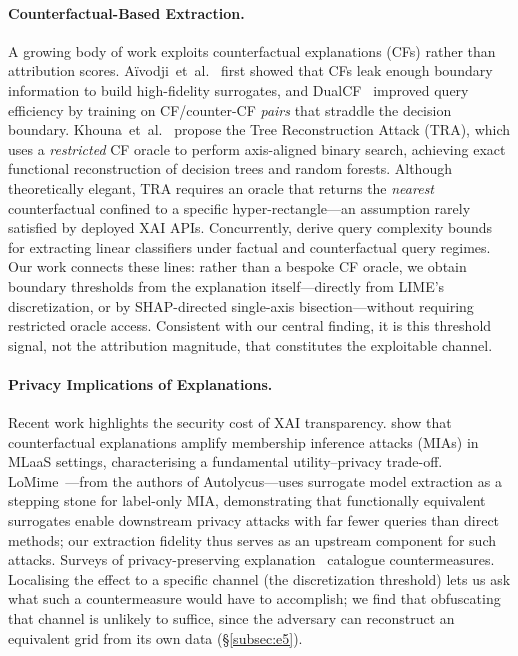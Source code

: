 \documentclass[sigconf,anonymous,review]{acmart}
\begin{document}
\paragraph{Counterfactual-Based Extraction.}
A growing body of work exploits counterfactual explanations (CFs) rather than
attribution scores.
A\"ivodji~et~al.~\cite{aivodji2020model} first showed that CFs leak enough
boundary information to build high-fidelity surrogates, and DualCF~\cite{wang2022dualcf}
improved query efficiency by training on CF/counter-CF \emph{pairs} that
straddle the decision boundary.
Khouna~et~al.~\cite{khouna2025tra} propose the Tree Reconstruction Attack (TRA),
which uses a \emph{restricted} CF oracle to perform axis-aligned binary search,
achieving exact functional reconstruction of decision trees and random forests.
Although theoretically elegant, TRA requires an oracle that returns the
\emph{nearest} counterfactual confined to a specific hyper-rectangle---an assumption
rarely satisfied by deployed XAI APIs.
Concurrently, \citet{otto2026linear} derive query complexity bounds for extracting
linear classifiers under factual and counterfactual query regimes.
Our work connects these lines: rather than a bespoke CF oracle, we obtain boundary
thresholds from the explanation itself---directly from LIME's discretization, or by
SHAP-directed single-axis bisection---without requiring restricted oracle access.
Consistent with our central finding, it is this threshold signal, not the attribution
magnitude, that constitutes the exploitable channel.

\paragraph{Privacy Implications of Explanations.}
Recent work highlights the security cost of XAI transparency.
\citet{ezzeddine2026membership} show that counterfactual explanations amplify
membership inference attacks (MIAs) in MLaaS settings, characterising a
fundamental utility--privacy trade-off.
LoMime~\cite{oksuz2026lomime}---from the authors of Autolycus---uses surrogate model
extraction as a stepping stone for label-only MIA, demonstrating that functionally
equivalent surrogates enable downstream privacy attacks with far fewer queries than
direct methods; our extraction fidelity thus serves as an upstream component for such
attacks.
Surveys of privacy-preserving explanation~\cite{nguyen2024survey} catalogue
countermeasures. Localising the effect to a specific channel (the discretization
threshold) lets us ask what such a countermeasure would have to accomplish; we find
that obfuscating that channel is unlikely to suffice, since the adversary can
reconstruct an equivalent grid from its own data (\S\ref{subsec:e5}).
\end{document}
